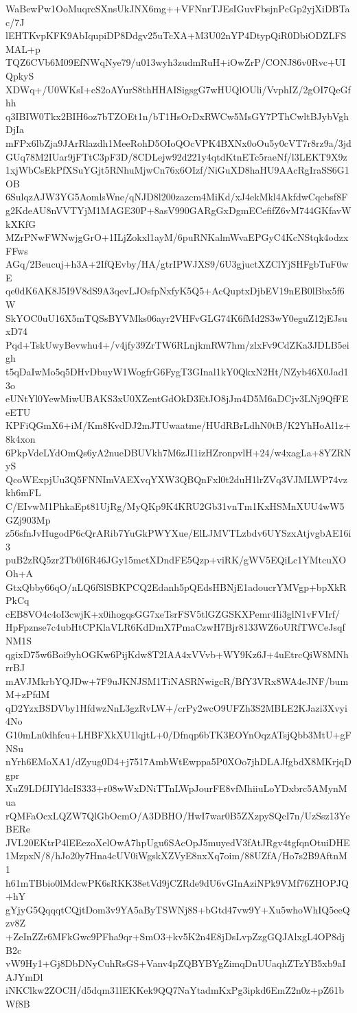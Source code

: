 WaBewPw1OoMuqrcSXnsUkJNX6mg++VFNnrTJEsIGuvFbsjnPcGp2yjXiDBTac/7J
lEHTKvpKFK9AbIqupiDP8Ddgv25uTcXA+M3U02nYP4DtypQiR0DbiODZLFSMAL+p
TQZ6CVb6M09EfNWqNye79/u013wyh3zudmRuH+iOwZrP/CONJ86v0Rvc+UIQpkyS
XDWq+/U0WKsI+cS2oAYurS8thHHAISigsgG7wHUQlOUli/VvphIZ/2gOI7QeGfhh
q3IBIW0Tkx2BIH6oz7bTZOEt1n/bT1HsOrDxRWCw5MsGY7PThCwltBJybVghDjIa
mFPx6lbZja9JArRlazdh1MeeRohD5OIoQOcVPK4BXNx0oOu5y0cVT7r8rz9a/3jd
GUq78M2IUar9jFTtC3pF3D/8CDLejw92d221y4qtdKtnETc5raeNf/l3LEKT9X9z
1xjWbCsEkPfXSuYGjt5RNhuMjwCn76x6OIzf/NiGuXD8haHU9AAcRgIraSS6G1OB
6SulqzAJW3YG5AomlsWne/qNJD8l200zazcm4MiKd/xJ4ekMkl4AkfdwCqcbsf8F
g2KdeAU8nVVTYjM1MAGE30P+8asV990GARgGxDgmECefifZ6vM744GKfavWkXKfG
MZrPNwFWNwjgGrO+1ILjZokxl1ayM/6puRNKalmWvaEPGyC4KcNStqk4odzxFFws
AGq/2Beucuj+h3A+2IfQEvby/HA/gtrIPWJXS9/6U3gjuctXZClYjSHFgbTuF0wE
qe0dK6AK8J5I9V8dS9A3qevLJOsfpNxfyK5Q5+AcQuptxDjbEV19nEB0lBbx5f6W
SkYOC0uU16X5mTQSsBYVMks06ayr2VHFvGLG74K6fMd2S3wY0eguZ12jEJsuxD74
Pqd+TskUwyBevwhu4+/v4jfy39ZrTW6RLnjkmRW7hm/zlxFv9CdZKa3JDLB5eigh
t5qDaIwMo5q5DHvDbuyW1WogfrG6FygT3GInal1kY0QkxN2Ht/NZyb46X0Jad13o
eUNtYl0YewMiwUBAKS3xU0XZentGdOkD3EtJO8jJm4D5M6aDCjv3LNj9QfFEeETU
KPFiQGmX6+iM/Km8KvdDJ2mJTUwaatme/HUdRBrLdhN0tB/K2YhHoAl1z+8k4xon
6PkpVdeLYdOmQs6yA2nueDBUVkh7M6zJI1izHZronpvlH+24/w4xagLa+8YZRNyS
QcoWExpjUu3Q5FNNImVAEXvqYXW3QBQnFxl0t2duH1lrZVq3VJMLWP74vzkh6mFL
C/EIvwM1PhkaEpt81UjRg/MyQKp9K4KRU2Gb31vnTm1KxHSMnXUU4wW5GZj903Mp
z56sfnJvHugodP6cQrARib7YuGkPWYXue/ElLJMVTLzbdv6UYSzxAtjvgbAE16i3
puB2zRQ5zr2Tb0I6R46JGy15mctXDndFE5Qzp+viRK/gWV5EQiLc1YMtcuXOOh+A
GtxQbby66qO/nLQ6fSlSBKPCQ2Edanh5pQEdsHBNjE1adoucrYMVgp+bpXkRPkCq
cEB8VO4c4oI3cwjK+x0ihogqsGG7xeTsrFSV5tlGZGSKXPemr4Ii3glN1vFVIrf/
HpFpznse7c4ubHtCPKlaVLR6KdDmX7PmaCzwH7Bjr8133WZ6oURfTWCeJsqfNM1S
qgixD75w6Boi9yhOGKw6PijKdw8T2IAA4xVVvb+WY9Kz6J+4uEtrcQiW8MNhrrBJ
mAVJMkrbYQJDw+7F9uJKNJSM1TiNASRNwigcR/BfY3VRx8WA4eJNF/bumM+zPfdM
qD2YzxBSDVby1HfdwzNnL3gzRvLW+/crPy2wcO9UFZh3S2MBLE2KJazi3Xvyi4No
G10mLn0dhfcu+LHBFXkXU1lqjtL+0/Dfnqp6bTK3EOYnOqzATsjQbb3MtU+gFNSu
nYrh6EMoXA1/dZyug0D4+j7517AmbWtEwppa5P0XOo7jhDLAJfgbdX8MKrjqDgpr
XuZ9LDfJIYldcIS333+r08wWxDNiTTnLWpJourFE8vfMhiiuLoYDxbrc5AMynMua
rQMFaOcxLQZW7QlGbOcmO/A3DBHO/HwI7war0B5ZXzpySQcI7n/UzSsz13YeBERe
JVL20EKtrP4lEEezoXelOwA7hpUgu6SAcOpJ5muyedV3fAtJRgv4tgfqnOtuiDHE
1MzpxN/8/hJo20y7Hna4cUV0iWgskXZVyE8nxXq7oim/88UZfA/Ho7s2B9AftnM1
h61mTBbio0lMdcwPK6sRKK38etVd9jCZRde9dU6vGInAziNPk9VMf76ZHOPJQ+hY
gYjyG5QqqqtCQjtDom3v9YA5aByTSWNj8S+bGtd47vw9Y+Xu5whoWhIQ5eeQzv8Z
+ZeInZZr6MFkGwc9PFha9qr+SmO3+kv5K2n4E8jDsLvpZzgGQJAlxgL4OP8djB2c
vW9Hy1+Gj8DbDNyCuhRsGS+Vanv4pZQBYBYgZimqDnUUaqhZTzYB5xb9aIAJYmDl
iNKClkw2ZOCH/d5dqm31lEKKek9QQ7NaYtadmKxPg3ipkd6EmZ2n0z+pZ61bWf8B
